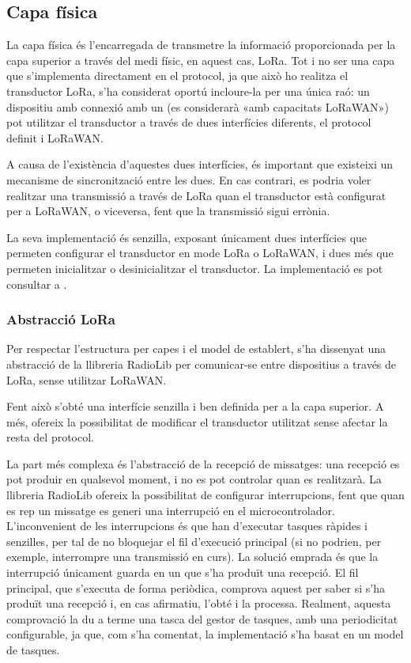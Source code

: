 \documentclass{tfgitic}[2024/07/01]
\begin{document}
\subsection{Capa física}
La capa física és l'encarregada de transmetre la informació proporcionada per la capa superior a través del medi físic, en aquest cas, LoRa. Tot i no ser una capa que s'implementa directament en el protocol, ja que això ho realitza el transductor LoRa, s'ha considerat oportú incloure-la per una única raó: un dispositiu amb connexió amb un  (es considerarà «amb capacitats LoRaWAN») pot utilitzar el transductor a través de dues interfícies diferents, el protocol definit i LoRaWAN.

A causa de l'existència d'aquestes dues interfícies, és important que existeixi un mecanisme de sincronització entre les dues. En cas contrari, es podria voler realitzar una transmissió a través de LoRa quan el transductor està configurat per a LoRaWAN, o viceversa, fent que la transmissió sigui errònia.

La seva implementació és senzilla, exposant únicament dues interfícies que permeten configurar el transductor en mode LoRa o LoRaWAN, i dues més que permeten inicialitzar o desinicialitzar el transductor. La implementació es pot consultar a .

\subsubsection{Abstracció LoRa}
Per respectar l'estructura per capes i el model de  establert, s'ha dissenyat una abstracció de la llibreria RadioLib per comunicar-se entre dispositius a través de LoRa, sense utilitzar LoRaWAN.

Fent això s'obté una interfície senzilla i ben definida per a la capa superior. A més, ofereix la possibilitat de modificar el transductor utilitzat sense afectar la resta del protocol. 

La part més complexa és l'abstracció de la recepció de missatges: una recepció es pot produir en qualsevol moment, i no es pot controlar quan es realitzarà. La llibreria RadioLib ofereix la possibilitat de configurar interrupcions, fent que quan es rep un missatge es generi una interrupció en el microcontrolador. L'inconvenient de les interrupcions és que han d’executar tasques ràpides i senzilles, per tal de no bloquejar el fil d'execució principal (si no podrien, per exemple, interrompre una transmissió en curs). La solució emprada és que la interrupció únicament guarda en un  que s'ha produït una recepció. El fil principal, que s'executa de forma periòdica, comprova aquest  per saber si s'ha produït una recepció i, en cas afirmatiu, l'obté i la processa. Realment, aquesta comprovació la du a terme una tasca del gestor de tasques, amb una periodicitat configurable, ja que, com s'ha comentat, la implementació s'ha basat en un model de tasques.
\end{document}
